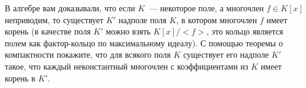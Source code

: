 В алгебре вам доказывали, что если $K$~--- некоторое поле, а многочлен $f \in K[x]$ неприводим, то существует $K'$ надполе
поля $K$, в котором многочлен $f$ имеет корень (в качестве поля $K'$ можно взять $K[x] / {<}f{>}$, это кольцо является полем
как фактор-кольцо по максимальному идеалу). С помощью теоремы о компактности покажите, что для всякого поля $K$ существует
его надполе $K'$ такое, что каждый неконстантный многочлен с коэффициентами из $K$ имеет корень в $K'$.